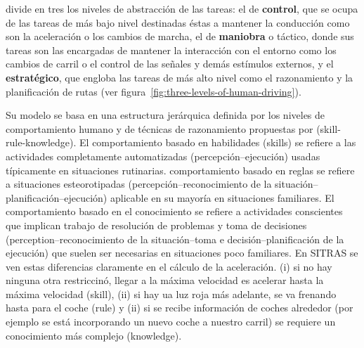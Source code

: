 \cite{michon1985critical} divide en tres los niveles de abstracción de las tareas: el de \textbf{control}, que se ocupa de las tareas de más bajo nivel destinadas éstas a mantener la conducción como son la aceleración o los cambios de marcha, el de \textbf{maniobra} o táctico, donde sus tareas son las encargadas de mantener la interacción con el entorno como los cambios de carril o el control de las señales y demás estímulos externos, y el \textbf{estratégico}, que engloba las tareas de más alto nivel como el razonamiento y la planificación de rutas (ver figura~\ref{fig:three-levels-of-human-driving}).


 Su modelo se basa en una estructura jerárquica definida por los niveles de comportamiento humano y de técnicas de razonamiento propuestas por \cite{Rasmussen1986} (skill-rule-knowledge). El comportamiento basado en habilidades (skills) se refiere a las actividades completamente automatizadas (percepción--ejecución) usadas típicamente en situaciones rutinarias. comportamiento basado en reglas se refiere a situaciones esteorotipadas (percepción--reconocimiento de la situación--planificación--ejecución) aplicable en su mayoría en situaciones familiares. El comportamiento basado en el conocimiento se refiere a actividades conscientes que implican trabajo de resolución de problemas y toma de decisiones (perception--reconocimiento de la situación--toma e decisión--planificación de la ejecución) que suelen ser necesarias en situaciones poco familiares. En SITRAS se ven estas diferencias claramente en el cálculo de la aceleración. (i) si no hay ninguna otra restriccinó, llegar a la máxima velocidad es acelerar hasta la máxima velocidad (skill), (ii) si hay ua luz roja más adelante, se va frenando hasta para el coche (rule) y (ii) si se recibe información de coches alrededor (por ejemplo se está incorporando un nuevo coche a nuestro carril) se requiere un conocimiento más complejo (knowledge).





